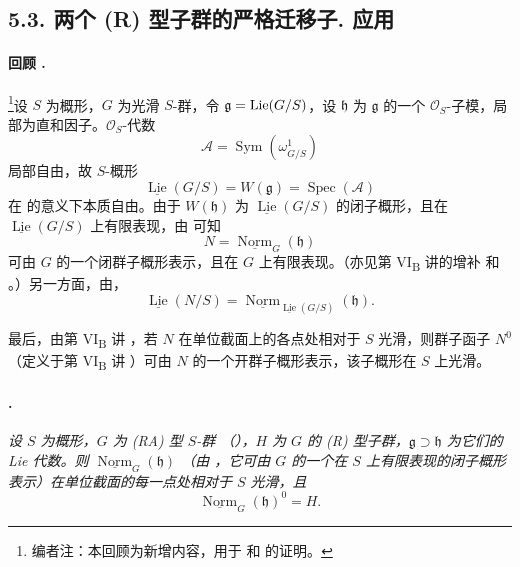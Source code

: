 \subsection*{5.3. 两个 \textup{(R)} 型子群的严格迁移子. 应用}

\paragraph{回顾 .}
\footnote{编者注：本回顾为新增内容，用于  和  的证明。}设 \(S\) 为概形，\(G\) 为光滑 \(S\)-群，令 \(\mathfrak g=\operatorname{Lie}(G/S)\)，设 \(\mathfrak h\) 为 \(\mathfrak g\) 的一个 \(\mathcal O_S\)-子模，局部为直和因子。\(\mathcal O_S\)-代数
\[
  \mathscr A=\operatorname{Sym}(\omega^1_{G/S})
\]
局部自由，故 \(S\)-概形
\[
  \underline{\operatorname{Lie}}(G/S)
  =
  W(\mathfrak g)
  =
  \operatorname{Spec}(\mathscr A)
\]
在 的意义下本质自由。由于 \(W(\mathfrak h)\) 为 \(\underline{\operatorname{Lie}}(G/S)\) 的闭子概形，且在 \(\underline{\operatorname{Lie}}(G/S)\) 上有限表现，由 \textup{} 可知
\[
  N=\underline{\operatorname{Norm}}_G(\mathfrak h)
\]
可由 \(G\) 的一个闭群子概形表示，且在 \(G\) 上有限表现。（亦见第 VI\textsubscript{B} 讲的增补  和  \textup{}。）另一方面，由，
\[
  \underline{\operatorname{Lie}}(N/S)
  =
  \underline{\operatorname{Norm}}_
    {\underline{\operatorname{Lie}}(G/S)}(\mathfrak h).
\]

最后，由第 VI\textsubscript{B} 讲 ，若 \(N\) 在单位截面上的各点处相对于 \(S\) 光滑，则群子函子 \(N^0\)（定义于第 VI\textsubscript{B} 讲 ）可由 \(N\) 的一个开群子概形表示，该子概形在 \(S\) 上光滑。

\paragraph{.}
\textit{设 \(S\) 为概形，\(G\) 为 \textup{(RA)} 型 \(S\)-群 \textup{（）}，\(H\) 为 \(G\) 的 \textup{(R)} 型子群，\(\mathfrak g\supset\mathfrak h\) 为它们的 Lie 代数。则 \(\underline{\operatorname{Norm}}_G(\mathfrak h)\) \textup{（由 ，它可由 \(G\) 的一个在 \(S\) 上有限表现的闭子概形表示）}在单位截面的每一点处相对于 \(S\) 光滑，且}
\[
  \underline{\operatorname{Norm}}_G(\mathfrak h)^0=H.
\]

